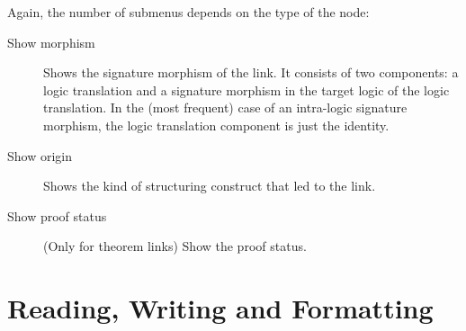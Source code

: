 \documentclass{article}
\begin{document}
\begin{description}
Again, the number of submenus depends on the type of the node:
\begin{description}
\item[Show morphism] Shows the signature morphism of the link. It consists
of two components: a logic translation and a signature morphism in the
target logic of the logic translation.
In the (most frequent) case
of an intra-logic signature morphism, the logic translation component is
just the identity.
\item[Show origin] Shows the kind of \CASL structuring construct that
led to the link.
\item[Show proof status] (Only for theorem links) Show the proof status.
\end{description}
\end{description}

\section{Reading, Writing and Formatting}
\end{document}
